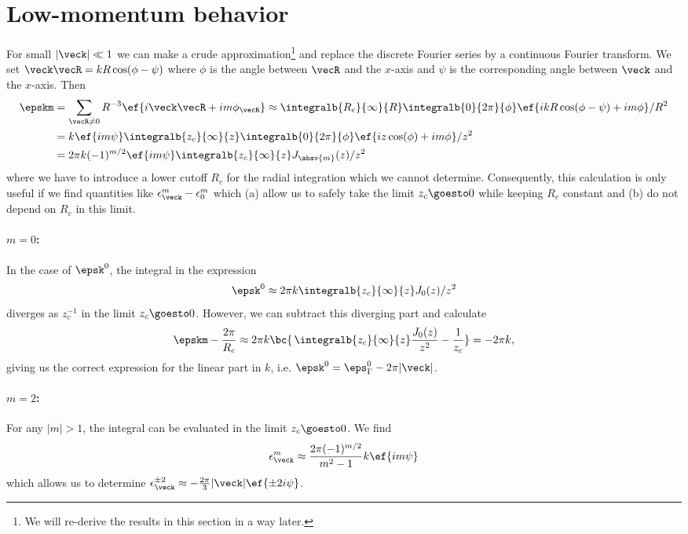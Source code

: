 \section{Low-momentum behavior}
For small $|\veck| \ll 1$ we can make a crude approximation\footnote{We will re-derive the results in this section in a  way later.} and replace the discrete Fourier series
by a continuous Fourier transform. We set $\veck\vecR = k R \cos(\phi-\psi)$ where
$\phi$ is the angle between $\vecR$ and the $x$-axis and $\psi$ is the
corresponding angle between $\veck$ and the $x$-axis. Then
\begin{align}
    \epskm &= \sum_{\vecR\ne 0} R^{-3} \ef{i\veck\vecR+i m \phi_\vecR}
    \approx \integralb{R_c}{\infty}{R} \integralb{0}{2\pi}{\phi} \ef{ikR \cos(\phi-\psi) + i m \phi} / R^2\\
    &= k \ef{im \psi} \integralb{z_c}{\infty}{z} \integralb{0}{2\pi}{\phi} \ef{i z \cos(\phi) + i m \phi} / z^2\\
    &= 2\pi k (-1)^{m/2} \ef{i m \psi} \integralb{z_c}{\infty}{z} J_{\absv{m}}(z)/z^2
\end{align}
where we have to introduce a lower cutoff $R_c$ for the radial integration which
we cannot determine. Consequently, this calculation is only useful
if we find quantities like $\epsilon_{\veck}^m-\epsilon^m_0$ which (a) allow
us to safely take the limit $z_c \goesto 0$ while keeping $R_c$ constant and
(b) do not depend on $R_c$ in this limit.

\paragraph{$m=0$:} In the case of $\epsk^0$, the integral in the expression
\begin{align}
    \epsk^0 \approx 2\pi k \integralb{z_c}{\infty}{z} J_0(z)/z^2
\end{align}
diverges as $z_c^{-1}$ in the limit $z_c \goesto 0$. However, we can subtract this diverging part and calculate
\begin{align}
    \epskm - \frac{2\pi}{R_c} \approx 2\pi k \bc{ \, \integralb{z_c}{\infty}{z} \frac{J_0(z)}{z^2} - \frac{1}{z_c} } = -2\pi k,
\end{align}
giving us the correct expression for the linear part in $k$, i.e. $\epsk^0=\eps_\Gamma^0 - 2\pi |\veck|$.

\paragraph{$m=2$:} For any $|m|>1$, the integral can be evaluated in the limit $z_c\goesto 0$. We find
\begin{align}
    \epsilon^m_{\veck} \approx \frac{2\pi (-1)^{m/2}}{m^2-1} k \ef{im \psi}
\end{align}
which allows us to determine $\epsilon^{\pm 2}_{\veck} \approx -\frac{2\pi}{3} |\veck| \ef{\pm 2 i \psi}$.

